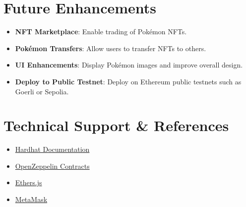 \documentclass{article}
\begin{document}
\section{Future Enhancements}
\begin{itemize}
    \item \textbf{NFT Marketplace}: Enable trading of Pokémon NFTs.
    \item \textbf{Pokémon Transfers}: Allow users to transfer NFTs to others.
    \item \textbf{UI Enhancements}: Display Pokémon images and improve overall design.
    \item \textbf{Deploy to Public Testnet}: Deploy on Ethereum public testnets such as Goerli or Sepolia.
\end{itemize}

\section{Technical Support \& References}
\begin{itemize}
    \item \href{https://hardhat.org/}{Hardhat Documentation}
    \item \href{https://docs.openzeppelin.com/contracts/}{OpenZeppelin Contracts}
    \item \href{https://docs.ethers.io/}{Ethers.js}
    \item \href{https://metamask.io/}{MetaMask}
\end{itemize}
\end{document}
